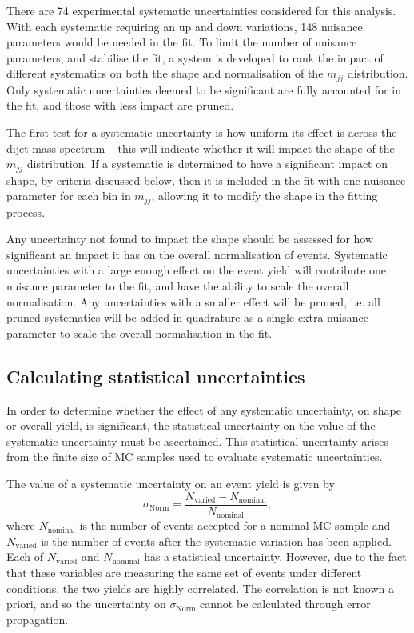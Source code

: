 
There are 74 experimental systematic uncertainties considered for this analysis.
With each systematic requiring an up and down variations, 148 nuisance
parameters would be needed in the fit. To limit the number of nuisance
parameters, and stabilise the fit, a system is developed to rank the impact of
different systematics on both the shape and normalisation of the $m_{jj}$
distribution. Only systematic uncertainties deemed to be significant are fully
accounted for in the fit, and those with less impact are pruned.

The first test for a systematic uncertainty is how uniform its effect is across
the dijet mass spectrum -- this will indicate whether it will impact the shape
of the $m_{jj}$ distribution. If a systematic is determined to have a
significant impact on shape, by criteria discussed below, then it is included in
the fit with one nuisance parameter for each bin in $m_{jj}$, allowing it to
modify the shape in the fitting process.

Any uncertainty not found to impact the shape should be assessed for how
significant an impact it has on the overall normalisation of events. Systematic
uncertainties with a large enough effect on the event yield will contribute one
nuisance parameter to the fit, and have the ability to scale the overall
normalisation. Any uncertainties with a smaller effect will be pruned, i.e. all
pruned systematics will be added in quadrature as a single extra nuisance
parameter to scale the overall normalisation in the fit.

\subsection{Calculating statistical uncertainties}

In order to determine whether the effect of any systematic uncertainty, on shape
or overall yield, is significant, the statistical uncertainty on the value of
the systematic uncertainty must be ascertained. This statistical uncertainty
arises from the finite size of \ac{MC} samples used to evaluate systematic
uncertainties.

The value of a systematic uncertainty on an event yield is given by
%
\begin{equation}
  \sigma_\text{Norm} = \frac{ N_\text{varied} - N_\text{nominal} } {
  N_\text{nominal} },
  \label{eqn:vbs-prune-sigmanorm}
\end{equation}
%
where $N_\text{nominal}$ is the number of events accepted for a nominal
\ac{MC} sample and $N_\text{varied}$ is the number of events after the
systematic variation has been applied. Each of $N_\text{varied}$ and
$N_\text{nominal}$ has a statistical uncertainty. However, due to the fact that
these variables are measuring the same set of events under different conditions,
the two yields are highly correlated. The correlation is not known a priori, and
so the uncertainty on $\sigma_\text{Norm}$ cannot be calculated through error
propagation.

